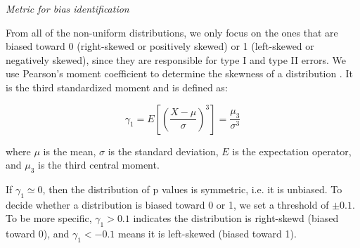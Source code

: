 \textit{Metric for bias identification}

From all of the non-uniform distributions, we only focus on the ones that are biased toward 0 (right-skewed or positively skewed) or 1 (left-skewed or negatively skewed), since they are responsible for type I and type II errors. We use Pearson's moment coefficient to determine the skewness of a distribution \cite{pearson1895contributions}. It is the third standardized moment and is defined as:

\begin{equation}\label{eq:skewness}
\gamma_1 = E\left[\left(\frac{X-\mu}{\sigma}\right)^3\right] = \frac{\mu_3}{\sigma^3}
\end{equation}

where $\mu$ is the mean, $\sigma$ is the standard deviation, $E$ is the expectation operator, and $\mu_3$ is the third central moment.

If $\gamma_1 \simeq 0$, then the distribution of p values is symmetric, i.e. it is unbiased. 
To decide whether a distribution is biased toward 0 or 1, we set a threshold of $\pm 0.1$.
To be more specific, $\gamma_1 > 0.1$ indicates the distribution is right-skewd (biased toward 0), and $\gamma_1 < -0.1$ means it is left-skewed (biased toward 1).




